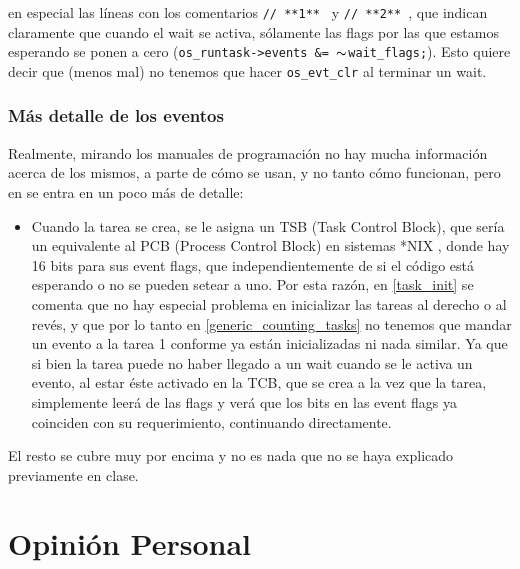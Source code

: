 \documentclass[a4paper,openright,12pt]{article}
\begin{document}
en especial las líneas con los comentarios \texttt{// **1**  } y \texttt{// **2**  }, que indican claramente
que cuando el wait se activa, sólamente las flags por las que estamos esperando se ponen a cero (\texttt{os\_runtask->events \&= $\thicksim$wait\_flags;}).
Esto quiere decir que (menos mal) no tenemos que hacer \texttt{os\_evt\_clr} al terminar un wait.

\subsubsection{Más detalle de los eventos}
Realmente, mirando los manuales de programación no hay mucha información acerca de los mismos, a parte de cómo se usan, y no tanto cómo funcionan, pero en \autocite[28]{rl_arm_gs}
se entra en un poco más de detalle:
\begin{itemize}
    \item Cuando la tarea se crea, se le asigna un TSB (Task Control Block), que sería un equivalente al PCB (Process Control Block) en sistemas *NIX
          \parencite{process_control_block_pcb_wikipedia}, donde hay 16 bits para sus event flags, que independientemente de si el código está esperando o no se pueden setear a uno.
          Por esta razón, en \ref{task_init} se comenta que no hay especial problema en inicializar las tareas al derecho o al revés, y que por lo tanto en \ref{generic_counting_tasks}
          no tenemos que mandar un evento a la tarea 1 conforme ya están inicializadas ni nada similar.
          Ya que si bien la tarea puede no haber llegado a un wait cuando se le activa un evento, al estar éste activado en la TCB, que se
          crea a la vez que la tarea, simplemente leerá de las flags y verá que los bits en las event flags ya coinciden con su requerimiento, continuando directamente.
\end{itemize}

El resto se cubre muy por encima y no es nada que no se haya explicado previamente en clase.


\clearpage
\section{Opinión Personal}
\end{document}
